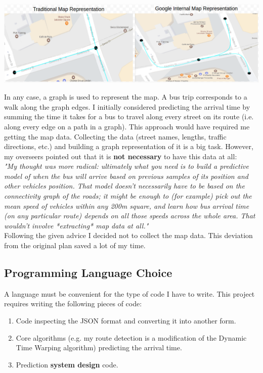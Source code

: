 \documentclass[12pt,a4paper,oneside,openright]{report}
\begin{document}
\includegraphics[width=\textwidth]{figs/google.png}

In any case, a graph is used to represent the map. A bus trip corresponds to a walk
along the graph edges. I initially considered predicting the arrival time by summing the
time it takes for a bus to travel along every street on its route (i.e. along every edge on
a path in a graph). This approach would have required
me getting the map data. Collecting the data (street names, lengths, traffic directions, etc.)
and building a graph representation of it is a big task. However, my overseers pointed out
that it is \textbf{not necessary} to have this data at all: \\

\textit{"My thought was more radical: ultimately what you need is to build a predictive
 model of when the bus will arrive based on previous samples of its position and other
 vehicles position. That model doesn't necessarily have to be based on the connectivity
 graph of the roads; it might be enough to (for example) pick out the mean speed of
 vehicles within any 200m square, and learn how bus arrival time (on any particular route)
 depends on all those speeds across the whole area. That wouldn't involve *extracting* map
 data at all."} \\

Following the given advice I decided not to collect the map data. This deviation from the
original plan saved a lot of my time.

\subsection{Programming Language Choice}

A language must be convenient for the type of code I have to write. This project requires writing
the following pieces of code:

\begin{enumerate}
\item Code inspecting the JSON format and converting it into another form.
\item Core algorithms (e.g. my route detection is a modification of the Dynamic Time Warping algorithm)
      predicting the arrival time.
\item Prediction \textbf{system design} code.
\end{enumerate}
\end{document}
